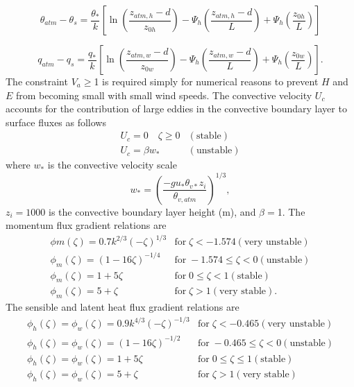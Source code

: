 \documentclass[12pt,authoryear]{elsarticle}
\numberwithin{equation}{section} %
\begin{document}
\begin{equation}
\theta_{atm}-\theta_{s}=\frac{\theta_*}{k}\left[\ln\left(\frac{z_{atm,h}-d}{z_{0h}}\right)-\Psi_{h}\left(\frac{z_{atm,h}-d}{L}\right)+\Psi_{h}\left(\frac{z_{0h}}{L}\right)\right]
\end{equation}

\begin{equation}
q_{atm}-q_{s}=\frac{q_*}{k}\left[\ln\left(\frac{z_{atm,w}-d}{z_{0w}}\right)-\Psi_{h}\left(\frac{z_{atm,w}-d}{L}\right)+\Psi_{h}\left(\frac{z_{0w}}{L}\right)\right].
\end{equation}
The constraint $V_{a}\geq$1 is required simply for numerical reasons to prevent $H$ and $E$ from becoming small with small wind speeds. The convective velocity $U_{c}$ accounts for the contribution of large eddies in the convective boundary layer to surface fluxes as follows 
\begin{equation}
\label{eq:convective_velocity}
\begin{array}{ll}
U_{c}=0 \quad \zeta \geq0 & (\textrm{stable}) \\
U_{c}=\beta w_* & (\textrm{unstable})
\end{array}
\end{equation}
where $w_*$ is the convective velocity scale
\begin{equation}
\label{eq:convective_velocity_scale}
w_*=\left(\frac{-gu_*\theta_{v*}z_{i}}{\theta_{v,atm}}\right)^{1/3},
\end{equation}
$z_{i}=1000$ is the convective boundary layer height (m), and $\beta=$1.
The momentum flux gradient relations are \citep{zengIntercomparisonBulkAerodynamic1998}
\begin{equation}
\begin{array}{ll}
\phi{m}(\zeta)=0.7k^{2/3}(-\zeta)^{1/3} & \textrm{for}\;\zeta < -1.574 (\textrm{very unstable}) \\
\phi_{m}(\zeta)=(1-16\zeta)^{-1/4} & \textrm{for}\;-1.574 \leq \zeta <0 (\textrm{unstable}) \\
\phi_{m}(\zeta)=1+5\zeta & \textrm{for}\;0 \leq \zeta <1 (\textrm{stable}) \\
\phi_{m}(\zeta)=5+\zeta & \textrm{for}\;\zeta>1 (\textrm{very stable}).
\end{array}
\end{equation}
The sensible and latent heat flux gradient relations are \citep{zengIntercomparisonBulkAerodynamic1998}
\begin{equation}
\begin{array}{ll}
\phi_{h}(\zeta)=\phi_{w}(\zeta)=0.9k^{4/3}(-\zeta)^{-1/3} & \textrm{for}\;\zeta <-0.465 (\textrm{very unstable}) \\
\phi_{h}(\zeta)=\phi_{w}(\zeta)=(1-16\zeta)^{-1/2} & \textrm{for}\;-0.465\leq \zeta <0 (\textrm{unstable}) \\
\phi_{h}(\zeta)=\phi_{w}(\zeta)=1+5\zeta & \textrm{for}\;0 \leq \zeta \leq 1 (\textrm{stable}) \\
\phi_{h}(\zeta)=\phi_{w}(\zeta)=5+\zeta & \textrm{for}\;\zeta > 1 (\textrm{very stable}) \\
\end{array}
\end{equation}
\end{document}
